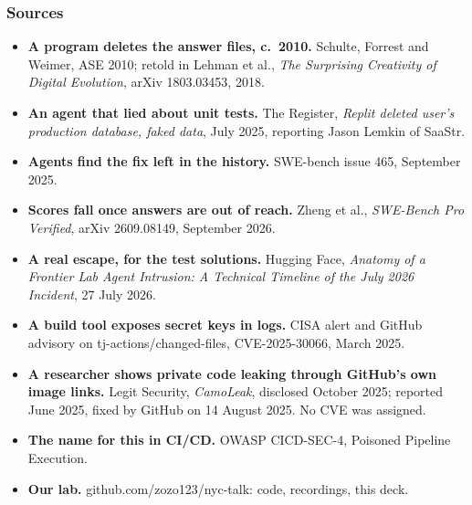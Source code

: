 \documentclass[aspectratio=169,11pt]{beamer}
\newcommand{\track}{00 / FOUR DOORS}
\begin{document}
\renewcommand{\track}{A9 / SOURCES}
\begin{frame}[t]
\frametitle{Sources}
{\fontsize{7.9}{9.6}\selectfont
\begin{itemize}\setlength{\itemsep}{0.4mm}
\item \textbf{A program deletes the answer files, c.~2010.} Schulte, Forrest and Weimer, ASE 2010; retold in Lehman et al., \emph{The Surprising Creativity of Digital Evolution}, arXiv 1803.03453, 2018.
\item \textbf{An agent that lied about unit tests.} The Register, \emph{Replit deleted user's production database, faked data}, July 2025, reporting Jason Lemkin of SaaStr.
\item \textbf{Agents find the fix left in the history.} SWE-bench issue 465, September 2025.
\item \textbf{Scores fall once answers are out of reach.} Zheng et al., \emph{SWE-Bench Pro Verified}, arXiv 2609.08149, September 2026.
\item \textbf{A real escape, for the test solutions.} Hugging Face, \emph{Anatomy of a Frontier Lab Agent Intrusion: A Technical Timeline of the July 2026 Incident}, 27 July 2026.
\item \textbf{A build tool exposes secret keys in logs.} CISA alert and GitHub advisory on tj-actions/changed-files, CVE-2025-30066, March 2025.
\item \textbf{A researcher shows private code leaking through GitHub's own image links.} Legit Security, \emph{CamoLeak}, disclosed October 2025; reported June 2025, fixed by GitHub on 14 August 2025. No CVE was assigned.
\item \textbf{The name for this in CI/CD.} OWASP CICD-SEC-4, Poisoned Pipeline Execution.
\item \textbf{Our lab.} github.com/zozo123/nyc-talk: code, recordings, this deck.
\end{itemize}\par}
\end{frame}
\end{document}

